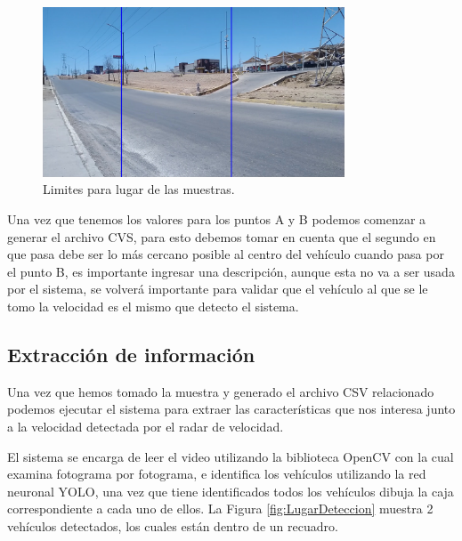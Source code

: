 \begin{figure}[H]
    \centering
    \includegraphics[width=0.8\textwidth]{Metodologia/imgs/LugarLimites.jpg}
    \caption{Limites para lugar de las muestras.}
    \label{fig:LugarLimites}
\end{figure}

Una vez que tenemos los valores para los puntos A y B podemos comenzar a generar el archivo CVS, para esto debemos tomar en cuenta que el segundo en que pasa debe ser lo más cercano posible al centro del vehículo cuando pasa por el punto B, es importante ingresar una descripción, aunque esta no va a ser usada por el sistema, se volverá importante para validar que el vehículo al que se le tomo la velocidad es el mismo que detecto el sistema.


\subsection{Extracción de información }

Una vez que hemos tomado la muestra y generado el archivo CSV relacionado podemos ejecutar el sistema para extraer las características que nos interesa junto a la velocidad detectada por el radar de velocidad.

El sistema se encarga de leer el video utilizando la biblioteca OpenCV con la cual examina fotograma por fotograma, e identifica los vehículos utilizando la red neuronal YOLO, una vez que tiene identificados todos los vehículos dibuja la caja correspondiente a cada uno de ellos. La Figura \ref{fig:LugarDeteccion} muestra 2 vehículos detectados, los cuales están dentro de un recuadro.

